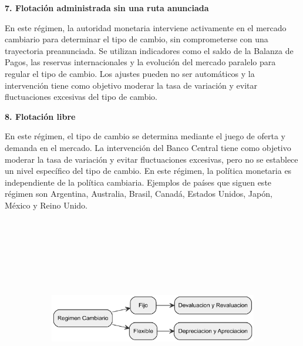 \documentclass[
  letterpaper,
  DIV=11,
  numbers=noendperiod]{scrartcl}
\begin{document}
\textbf{7. Flotación administrada sin una ruta anunciada}

En este régimen, la autoridad monetaria interviene activamente en el
mercado cambiario para determinar el tipo de cambio, sin comprometerse
con una trayectoria preanunciada. Se utilizan indicadores como el saldo
de la Balanza de Pagos, las reservas internacionales y la evolución del
mercado paralelo para regular el tipo de cambio. Los ajustes pueden no
ser automáticos y la intervención tiene como objetivo moderar la tasa de
variación y evitar fluctuaciones excesivas del tipo de cambio.

\textbf{8. Flotación libre}

En este régimen, el tipo de cambio se determina mediante el juego de
oferta y demanda en el mercado. La intervención del Banco Central tiene
como objetivo moderar la tasa de variación y evitar fluctuaciones
excesivas, pero no se establece un nivel específico del tipo de cambio.
En este régimen, la política monetaria es independiente de la política
cambiaria. Ejemplos de países que siguen este régimen son Argentina,
Australia, Brasil, Canadá, Estados Unidos, Japón, México y Reino Unido.

\begin{figure}

\caption{\label{fig-1}Regímenes cambiarios}

{\centering 

\begin{figure}[H]

{\centering \includegraphics[width=5.5in,height=3.5in]{index_files/figure-latex/dot-figure-1.png}

}

\end{figure}

}

\end{figure}
\end{document}
